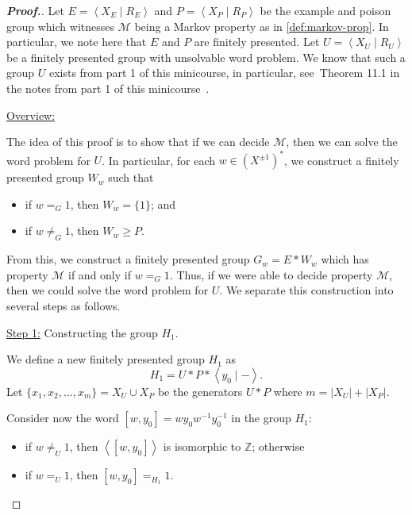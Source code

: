 \documentclass[11pt,a4paper,reqno]{amsart}
\theoremstyle{plain}
\theoremstyle{definition}
\theoremstyle{definition}
\renewcommand\geq\geqslant
\newenvironment{myproof}{\begin{proof}[\normalfont\bfseries Proof.]}{\end{proof}}
\begin{document}
\begin{myproof}
	Let $E = \left\langle X_E \mid R_E \right\rangle$ and $P = \left\langle X_P \mid R_P \right\rangle$ be the example and poison group which witnesses $\mathcal M$ being a Markov property as in \cref{def:markov-prop}.
	In particular, we note here that $E$ and $P$ are finitely presented.
	Let $U = \left\langle X_U \mid R_U\right\rangle$ be a finitely presented group with unsolvable word problem.
  We know that such a group $U$ exists from part 1 of this minicourse, in particular, see~Theorem 11.1 in the notes from part 1 of this minicourse~\cite{minicoursePart1}.

	\medskip

	\noindent
	\underline{Overview:}

	\smallskip
	\noindent
	The idea of this proof is to show that if we can decide $\mathcal M$, then we can solve the word problem for $U$.
	In particular, for each $w\in (X^{\pm 1})^*$, we construct a finitely presented group $W_w$ such that
	\begin{itemize}
		\item if $w=_G 1$, then $W_w = \{1\}$; and
		\item if $w\neq_G 1$, then $W_w\geq P$.
	\end{itemize}
	From this, we construct a finitely presented group $G_w = E*W_w$ which has property $\mathcal M$ if and only if $w =_G 1$.
	Thus, if we were able to decide property $\mathcal M$, then we could solve the word problem for $U$.
	We separate this construction into several steps as follows.

	\medskip

	\noindent
	\underline{Step 1:} Constructing the group $H_1$.

	\smallskip
	\noindent
	We define a new finitely presented group $H_1$ as
	\[
		H_1
		=
		U * P * \left\langle y_0 \mid - \right\rangle.
	\]
	Let $\{x_1,x_2,\ldots,x_m\} = X_U \cup X_P$ be the generators $U * P$ where $m = |X_U| + |X_P|$.

	Consider now the word $[w,y_0] = w y_0 w^{-1} y_0^{-1}$ in the group $H_1$:
	\begin{itemize}
		\item if $w\neq_U 1$, then $\left\langle [w,y_0] \right\rangle$ is isomorphic to $\mathbb Z$; otherwise
		\item if $w=_U 1$, then $[w,y_0] =_{H_1} 1$.
	\end{itemize}


\end{myproof}
\end{document}
